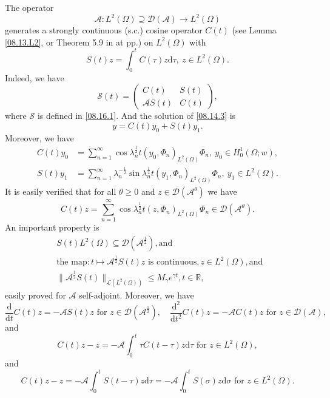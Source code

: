 \documentclass[preprint,12pt]{elsarticle}
\theoremstyle{definition}   %
\numberwithin{equation}{section}
\def\ra{\rightarrow}
\def\s{\subseteq}
\def\sps{\supseteq}
\def\Om{\Omega}
\def\la{\lambda}
\def\ga{\gamma}
\def\si{\sigma}
\def\iy{\infty}
\def\f{\frac}
\def\df{\mathrm d}
\def\mcL{\mathcal{L}}
\def\mcS{\mathcal{S}}
\def\mcA{\mathcal{A}}
\def\mcD{\mathcal{D}}
\newcommand{\R}{\mathbb R}
\begin{document}
The operator 
\begin{equation*}
	\mcA: L^2(\Om)\sps \mcD(\mcA)\ra L^2(\Om)
\end{equation*}
generates a strongly continuous (s.c.) cosine operator $C(t)$ (see Lemma \ref{08.13.L2}, or Theorem 5.9 in \cite{Fattorini} at pp.) on $L^2(\Om)$ with 
\begin{equation*}
	S(t)z=\int_0^tC(\tau)z\df\tau, \ z\in L^2(\Om). 
\end{equation*}
Indeed, we have 
\begin{equation*}
	\mcS(t)=
	\begin{pmatrix}
		C(t) & S(t) \\
		\mcA S(t) &C(t)
	\end{pmatrix}, 
\end{equation*}
where $\mcS$ is defined in \eqref{08.16.1}. 
And the solution of \eqref{08.14.3} is 
\begin{equation}\label{08.15.7}
	y=C(t)y_0+S(t)y_1. 
\end{equation}
Moreover, we have 
\begin{equation}\label{08.19.1}
	\begin{split}
		C(t)y_0
		&=\sum_{n=1}^\iy \cos \la_n^\f{1}{2}t(y_0, \Phi_n)_{L^2(\Om)}\Phi_n, \ y_0\in H_0^1(\Om;w),\\
		S(t)y_1
		&=\sum_{n=1}^\iy \la_n^{-\f{1}{2}}\sin \la_n^\f{1}{2}t (y_1,\Phi_n)_{L^2(\Om)}\Phi_n, \ y_1\in L^2(\Om). 
	\end{split}
\end{equation}
It is easily verified that for all $\theta\geq 0$ and  $z\in \mcD(\mcA^\theta)$ we have 
\begin{equation}\label{08.18.3}
	C(t)z=\sum_{n=1}^\iy \cos\la_n^\f{1}{2} t(z, \Phi_n)_{L^2(\Om)}\Phi_n\in \mcD(\mcA^\theta).
\end{equation}
An important property is 
\begin{equation}\label{08.15.4}
	\begin{split}
		&S(t)L^2(\Om)\s \mcD(\mcA^\f{1}{2}), \mbox{and }\\
		&\mbox{the map}: t\mapsto \mcA^\f{1}{2}S(t) z \mbox{ is   continuous}, z\in L^2(\Om), \mbox{and }\\ &\|\mcA^\f{1}{2}S(t)\|_{\mcL(L^2(\Om))}\leq M_\ga e^{\ga t}, t\in\R, 
	\end{split}
\end{equation}
easily proved for $\mcA$ self-adjoint. Moreover, we have 
\begin{equation}\label{09.03.3}
	\f{\df }{\df t}C(t)z=-\mcA S(t)z \mbox{ for } z\in \mcD(\mcA^\f{1}{2}),\quad \f{\df^2}{\df t^2}C(t)z=-\mcA C(t)z \mbox{ for } z\in \mcD(\mcA), 
\end{equation}
and 
\begin{equation*}
	C(t)z-z=-\mcA\int_0^t\tau C(t-\tau)z\df \tau \mbox{ for } z\in L^2(\Om), 
\end{equation*}
and 
\begin{equation*}
	C(t)z-z=-\mcA\int_0^tS(t-\tau)z\df\tau=-\mcA\int_0^tS(\si)z\df\si \mbox{ for } z\in L^2(\Om). 
\end{equation*}
\end{document}
